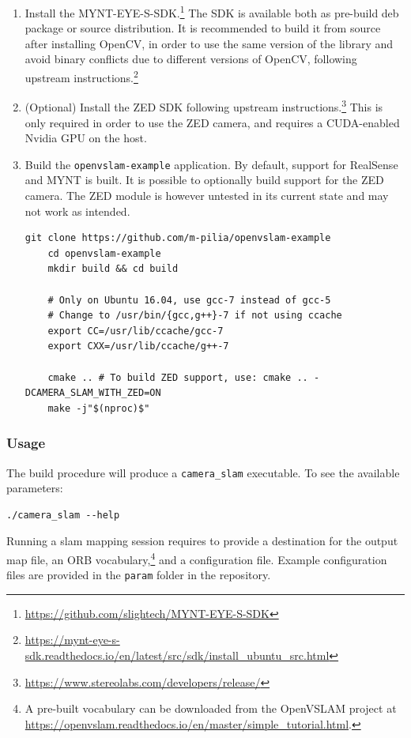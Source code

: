 \documentclass[11pt, letterpaper, twoside]{article}
\begin{document}
\begin{enumerate}
    \item Install the
        MYNT-EYE-S-SDK.\footnote{\url{https://github.com/slightech/MYNT-EYE-S-SDK}}
        The SDK is available both as pre-build deb package or source
        distribution. It is recommended to build it from source after
        installing OpenCV, in order to use the same version of the library and
        avoid binary conflicts due to different versions of OpenCV, following
        upstream
        instructions.\footnote{\url{https://mynt-eye-s-sdk.readthedocs.io/en/latest/src/sdk/install_ubuntu_src.html}}

    \item (Optional) Install the ZED SDK following upstream
        instructions.\footnote{\url{https://www.stereolabs.com/developers/release/}}
        This is only required in order to use the ZED camera, and requires a
        CUDA-enabled Nvidia GPU on the host.

    \item Build the \texttt{openvslam-example} application. By default, support
        for RealSense and MYNT is built. It is possible to optionally build
        support for the ZED camera. The ZED module is however untested in its
        current state and may not work as intended.
\begin{Verbatim}[samepage=true]
    git clone https://github.com/m-pilia/openvslam-example
    cd openvslam-example
    mkdir build && cd build

    # Only on Ubuntu 16.04, use gcc-7 instead of gcc-5
    # Change to /usr/bin/{gcc,g++}-7 if not using ccache
    export CC=/usr/lib/ccache/gcc-7
    export CXX=/usr/lib/ccache/g++-7

    cmake .. # To build ZED support, use: cmake .. -DCAMERA_SLAM_WITH_ZED=ON
    make -j"$(nproc)$"
\end{Verbatim}

\end{enumerate}

\subsubsection{Usage}

The build procedure will produce a \texttt{camera\_slam} executable. To see the
available parameters:
\begin{Verbatim}[samepage=true]
    ./camera_slam --help
\end{Verbatim}

Running a \gls{slam} mapping session requires to provide a destination for the
output map file, an ORB vocabulary,\footnote{A pre-built vocabulary can be
downloaded from the OpenVSLAM project at
\url{https://openvslam.readthedocs.io/en/master/simple_tutorial.html}.} and a
configuration file. Example configuration files are provided in the
\texttt{param} folder in the repository.
\end{document}
